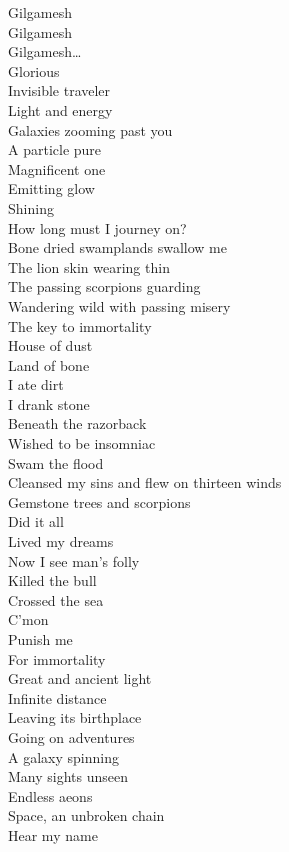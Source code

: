 Gilgamesh \\
Gilgamesh \\
Gilgamesh… \\

Glorious  \\
Invisible traveler \\
Light and energy \\
Galaxies zooming past you \\
A particle pure \\
Magnificent one \\
Emitting glow \\
Shining \\
How long must I journey on? \\

Bone dried swamplands swallow me \\
The lion skin wearing thin \\
The passing scorpions guarding \\
Wandering wild with passing misery \\
The key to immortality \\

House of dust \\
Land of bone \\
I ate dirt \\
I drank stone \\
Beneath the razorback \\
Wished to be insomniac \\
Swam the flood \\
Cleansed my sins and flew on thirteen winds \\
Gemstone trees and scorpions \\
Did it all \\
Lived my dreams \\
Now I see man's folly \\
Killed the bull \\
Crossed the sea \\
C'mon  \\
Punish me \\
For immortality \\

Great and ancient light \\
Infinite distance \\
Leaving its birthplace \\
Going on adventures \\
A galaxy spinning \\
Many sights unseen \\
Endless aeons \\
Space, an unbroken chain \\
Hear my name \\


